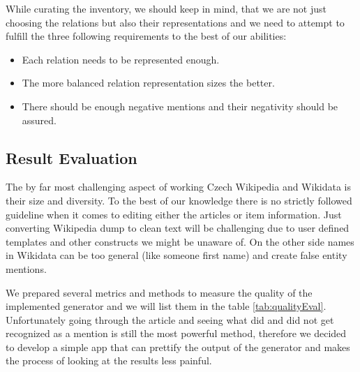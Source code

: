 While curating the inventory, we should keep in mind, that we are not just choosing the relations but also their representations and we need to attempt to fulfill the three following requirements to the best of our abilities:
\begin{itemize}
\item Each relation needs to be represented enough.
\item The more balanced relation representation sizes the better.
\item There should be enough negative mentions and their negativity should be assured. 

\end{itemize}

\subsection{Result Evaluation}
The by far most challenging aspect of working Czech Wikipedia and Wikidata is their size and diversity. To the best of our knowledge there is no strictly followed guideline when it comes to editing either the articles or item information. Just converting Wikipedia dump to clean text will be challenging due to user defined templates and other constructs we might be unaware of. On the other side names in Wikidata can be too general (like someone first name) and create false entity mentions. 

We prepared several metrics and methods to measure the quality of the implemented generator and we will list them in the table \ref{tab:qualityEval}. Unfortunately going through the article and seeing what did and did not get recognized as a mention is still the most powerful method, therefore we decided to develop a simple app that can prettify the output of the generator and makes the process of looking at the results less painful.  

